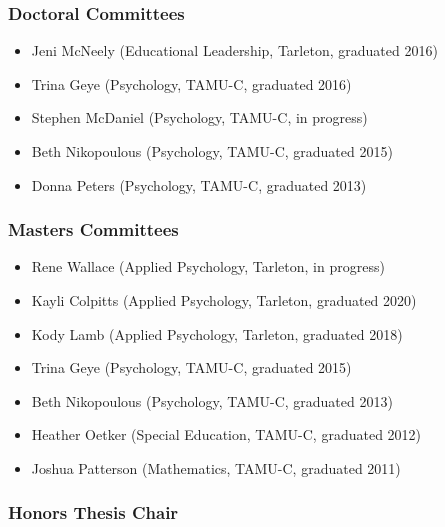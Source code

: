 \documentclass[article,10pt]{article}
\begin{document}
\subsubsection*{Doctoral Committees}
\label{sec:org14916ec}

\begin{itemize}
\item Jeni McNeely (Educational Leadership, Tarleton, graduated 2016)
\item Trina Geye (Psychology, TAMU-C, graduated 2016)
\item Stephen McDaniel (Psychology, TAMU-C, in progress)
\item Beth Nikopoulous (Psychology, TAMU-C, graduated 2015)
\item Donna Peters (Psychology, TAMU-C, graduated 2013)
\end{itemize}

\subsubsection*{Masters Committees}
\label{sec:orgd36d7b3}
\begin{itemize}
\item Rene Wallace (Applied Psychology, Tarleton, in progress)
\item Kayli Colpitts (Applied Psychology, Tarleton, graduated 2020)
\item Kody Lamb (Applied Psychology, Tarleton, graduated 2018)
\item Trina Geye (Psychology, TAMU-C, graduated 2015)
\item Beth Nikopoulous (Psychology, TAMU-C, graduated 2013)
\item Heather Oetker (Special Education, TAMU-C, graduated 2012)
\item Joshua Patterson (Mathematics, TAMU-C, graduated 2011)
\end{itemize}

\subsubsection*{Honors Thesis Chair}
\label{sec:orgf613cf7}
\end{document}
